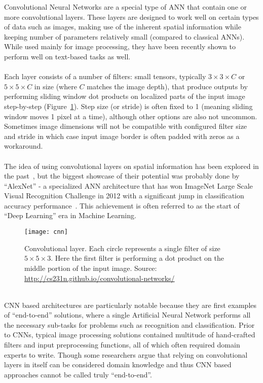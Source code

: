 Convolutional Neural Networks are a special type of ANN that contain one or more convolutional layers. These layers are designed to work well on certain types of data such as images, making use of the inherent spatial information while keeping number of parameters relatively small (compared to classical ANNs). While used mainly for image processing, they have been recently shown to perform well on text-based tasks as well.
\\\\
Each layer consists of a number of filters: small tensors, typically $3 \times 3 \times C$ or $5\times 5 \times C$ in size (where $C$ matches the image depth), that produce outputs by performing sliding window dot products on localized parts of the input image step-by-step (Figure~\ref{fig:cnn}). Step size (or stride) is often fixed to 1 (meaning sliding window moves 1 pixel at a time), although other options are also not uncommon. Sometimes image dimensions will not be compatible with configured filter size and stride in which case input image border is often padded with zeros as a workaround. 
\\\\
The idea of using convolutional layers on spatial information has been explored in the past~\cite{Fukushima1980}, but the biggest showcase of their potential was probably done by “AlexNet” - a specialized ANN architecture that has won ImageNet Large Scale Visual Recognition Challenge in 2012 with a significant jump in classification accuracy performance~\cite{Krizhevsky2012}. This achievement is often referred to as the start of “Deep Learning” era in Machine Learning.

\begin{figure}[ht]
\begin{center}
\texttt{[image: cnn]}
\caption{Convolutional layer. Each circle represents a single filter of size $5\times 5 \times 3$. Here the first filter is performing a dot product on the middle portion of the input image.
Source: \url{http://cs231n.github.io/convolutional-networks/} }
\label{fig:cnn}
\end{center}
\end{figure}

\noindent\\ CNN based architectures are particularly notable because they are first examples of “end-to-end” solutions, where a single Artificial Neural Network performs all the necessary sub-tasks for problems such as recognition and classification. Prior to CNNs, typical image processing solutions contained multitude of hand-crafted filters and input preprocessing functions, all of which often required domain experts to write. Though some researchers argue that relying on convolutional layers in itself can be considered domain knowledge and thus CNN based approaches cannot be called truly “end-to-end”.

